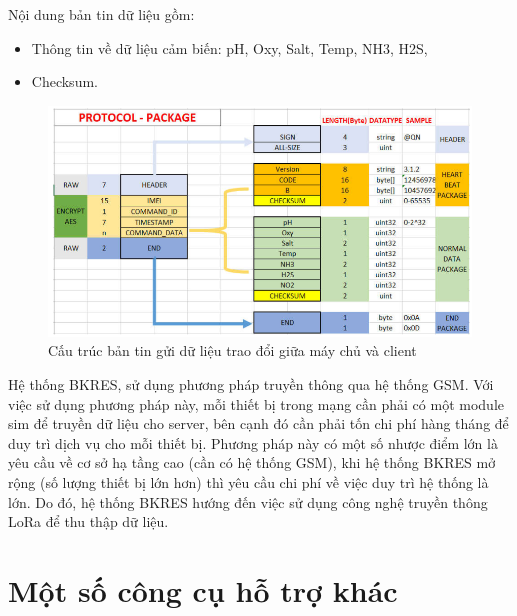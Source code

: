 Nội dung bản tin dữ liệu gồm:
\begin{itemize}
\item Thông tin về dữ liệu cảm biến: pH, Oxy, Salt, Temp, NH3, H2S,
\item Checksum.
\end{itemize} 
\begin{figure}[h]
    \begin{center}
     \includegraphics[scale=0.5]{image/hinh2_13}
    \end{center}
    \caption{Cấu trúc bản tin gửi dữ liệu trao đổi giữa máy chủ và client}
    \label{refhinh2_13}
\end{figure}
\par 
Hệ thống BKRES, sử dụng phương pháp truyền thông qua hệ thống GSM. Với việc sử dụng phương pháp này, mỗi thiết bị trong mạng cần phải có một module sim để truyền dữ liệu cho server, bên cạnh đó cần phải tốn chi phí hàng tháng để duy trì dịch vụ cho mỗi thiết bị. Phương pháp này có một số nhược điểm lớn là yêu cầu về cơ sở hạ tầng cao (cần có hệ thống GSM), khi hệ thống BKRES mở rộng (số lượng thiết bị lớn hơn) thì yêu cầu chi phí về việc duy trì hệ thống là lớn. Do đó, hệ thống BKRES hướng đến việc sử dụng công nghệ truyền thông LoRa để thu thập dữ liệu.
\section{Một số công cụ hỗ trợ khác}

